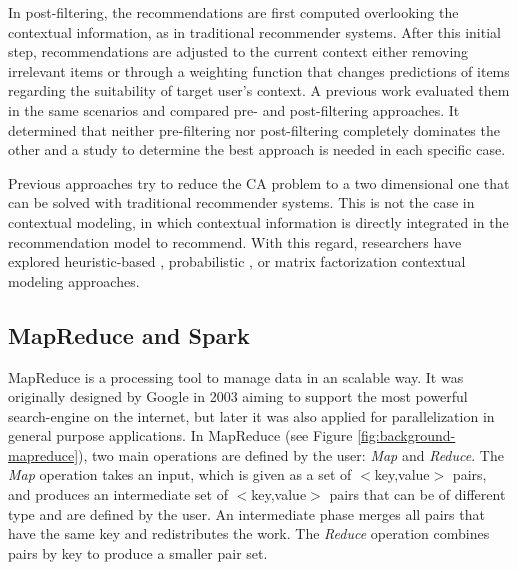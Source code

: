 \documentclass[preprint]{elsarticle}
\begin{document}
\begin{spacing}{1.5}
In post-filtering, the recommendations are first computed overlooking the contextual information, as in traditional recommender systems. After this initial step, recommendations are adjusted to the current context either removing irrelevant items or through a weighting function that changes predictions of items regarding the suitability of target user's context. A previous work \cite{Panniello2009} evaluated them in the same scenarios and compared pre- and post-filtering approaches. It determined that neither pre-filtering nor post-filtering completely dominates the other and a study to determine the best approach is needed in each specific case.

Previous approaches try to reduce the CA problem to a two dimensional one that can be solved with traditional recommender systems. This is not the case in contextual modeling, in which contextual information is directly integrated in the recommendation model to recommend. With this regard, researchers have explored heuristic-based \cite{Panniello2014}, probabilistic \cite{Adomavicius2005b}, or matrix factorization \cite{Baltrunas2011c} contextual modeling approaches.

\subsection{MapReduce and Spark}
\label{sec:background-mapreduce-and-spark}

MapReduce \cite{Dean2008} is a processing tool to manage data in an scalable way. It was originally designed by Google in 2003 aiming to support the most powerful search-engine on the internet, but later it was also applied for parallelization in general purpose applications. In MapReduce (see Figure \ref{fig:background-mapreduce}), two main operations are defined by the user: \emph{Map} and \emph{Reduce}. The \emph{Map} operation takes an input, which is given as a set of $<$key,value$>$ pairs, and produces an intermediate set of $<$key,value$>$ pairs that can be of different type and are defined by the user. An intermediate phase merges all pairs that have the same key and redistributes the work. The \emph{Reduce} operation combines pairs by key to produce a smaller pair set.


\end{spacing}
\end{document}
